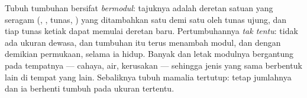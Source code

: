 \begin{proposition}\label{prop:b1:flowering-plant-organization:modular}
Tubuh tumbuhan bersifat \emph{bermodul}:
tajuknya adalah deretan satuan yang seragam (, , tunas, )
yang ditambahkan satu demi satu oleh tunas ujung, dan tiap tunas ketiak
dapat memulai deretan baru. Pertumbuhannya \emph{tak
tentu}: tidak ada ukuran dewasa, dan
tumbuhan itu terus menambah modul, dan dengan demikian permukaan,
selama ia hidup. Banyak dan letak modulnya bergantung pada tempatnya ---
cahaya, air, kerusakan --- sehingga jenis yang sama berbentuk lain di
tempat yang lain. Sebaliknya tubuh mamalia tertutup:  tetap
jumlahnya dan ia berhenti tumbuh pada ukuran tertentu.
\end{proposition}

